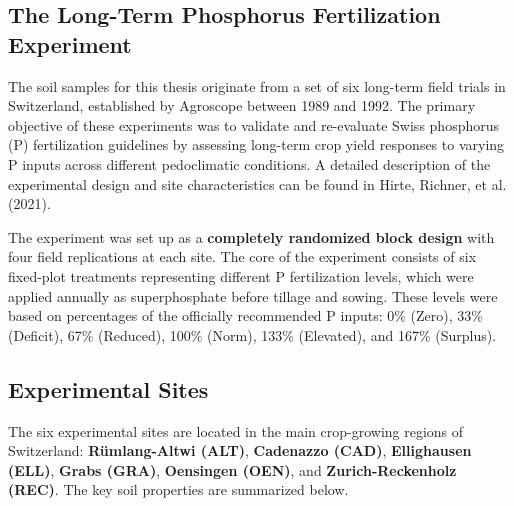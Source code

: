 \documentclass[
  a4paper,
]{article}
\begin{document}
\subsection{The Long-Term Phosphorus Fertilization
Experiment}\label{sec-the-long-term-phosphorus-fertilization-experiment}

The soil samples for this thesis originate from a set of six long-term
field trials in Switzerland, established by Agroscope between 1989 and
1992. The primary objective of these experiments was to validate and
re-evaluate Swiss phosphorus (P) fertilization guidelines by assessing
long-term crop yield responses to varying P inputs across different
pedoclimatic conditions. A detailed description of the experimental
design and site characteristics can be found in Hirte, Richner, et al.
(2021).

The experiment was set up as a \textbf{completely randomized block
design} with four field replications at each site. The core of the
experiment consists of six fixed-plot treatments representing different
P fertilization levels, which were applied annually as superphosphate
before tillage and sowing. These levels were based on percentages of the
officially recommended P inputs: 0\% (Zero), 33\% (Deficit), 67\%
(Reduced), 100\% (Norm), 133\% (Elevated), and 167\% (Surplus).

\subsection{Experimental Sites}\label{sec-experimental-sites}

The six experimental sites are located in the main crop-growing regions
of Switzerland: \textbf{Rümlang-Altwi (ALT)}, \textbf{Cadenazzo (CAD)},
\textbf{Ellighausen (ELL)}, \textbf{Grabs (GRA)}, \textbf{Oensingen
(OEN)}, and \textbf{Zurich-Reckenholz (REC)}. The key soil properties
are summarized below.
\end{document}
